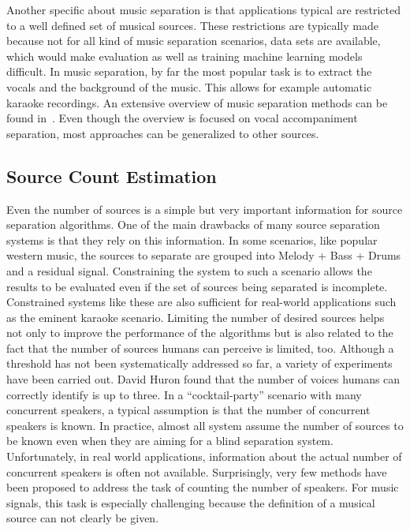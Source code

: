 Another specific about music separation is that applications typical are restricted to a well defined set of musical sources.
These restrictions are typically made because not for all kind of music separation scenarios, data sets are available, which would make evaluation as well as training machine learning models difficult.
In music separation, by far the most popular task is to extract the vocals and the background of the music.
This allows for example automatic karaoke recordings.
An extensive overview of music separation methods can be found in~\cite{rafii18}.
Even though the overview is focused on vocal accompaniment separation, most approaches can be generalized to other sources.

\subsection{Source Count Estimation}
Even the number of sources is a simple but very important information for source separation algorithms. One of the main drawbacks of many source separation systems is that they rely on this information. In some scenarios, like popular western music, the sources to separate are grouped into Melody + Bass + Drums and a residual signal. Constraining the system to such a scenario allows the results to be evaluated even if the set of sources being separated is incomplete. Constrained systems like these are also sufficient for real-world applications such as the eminent karaoke scenario. Limiting the number of desired sources helps not only to improve the performance of the algorithms but is also related to the fact that the number of sources humans can perceive is limited, too. Although a threshold has not been systematically addressed so far, a variety of experiments have been carried out. David Huron found \cite{huron89} that the number of voices humans can correctly identify is up to three.
In a “cocktail-party” scenario with many concurrent speakers, a typical assumption is that the number of concurrent speakers is known.
In practice, almost all system assume the number of sources to be known even when they are aiming for a blind separation system.
Unfortunately, in real world applications, information about the actual number of concurrent speakers
is often not available.
Surprisingly, very few methods have been proposed to address the task of
counting the number of speakers.
For music signals, this task is especially challenging because the definition of a musical source can not clearly be given.
